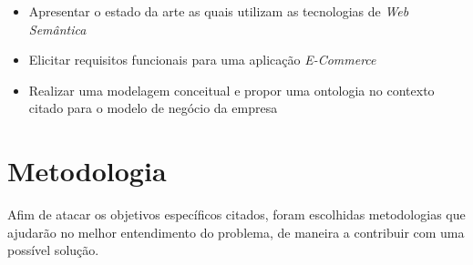 	\begin{itemize}
	\item{Apresentar o estado da arte as quais utilizam as tecnologias de \textit{Web Semântica}}
	\item{Elicitar requisitos funcionais para uma aplicação \textit{E-Commerce}}
	\item{Realizar uma modelagem conceitual e propor uma ontologia no contexto citado para o modelo de negócio da empresa}
	\end{itemize}

\section{Metodologia}

Afim de atacar os objetivos específicos citados, foram escolhidas metodologias que ajudarão no melhor entendimento do problema, de maneira a contribuir com uma possível solução.

